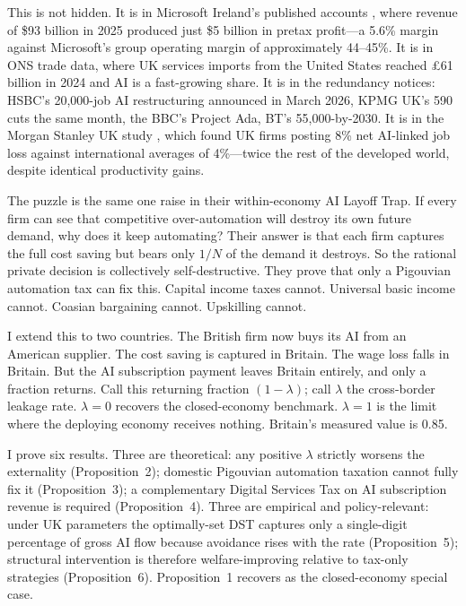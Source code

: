 \documentclass[11pt,letterpaper]{article}
\theoremstyle{remark}
\begin{document}
This is not hidden. It is in Microsoft Ireland's published accounts \citep{ons_2024}, where revenue of \$93 billion in 2025 produced just \$5 billion in pretax profit---a 5.6\% margin against Microsoft's group operating margin of approximately 44--45\%. It is in {ONS} trade data, where {UK} services imports from the United States reached \pounds61 billion in 2024 and {AI} is a fast-growing share. It is in the redundancy notices: {HSBC}'s 20{,}000-job {AI} restructuring announced in March 2026, KPMG {UK}'s 590 cuts the same month, the {BBC}'s Project Ada, {BT}'s 55{,}000-by-2030. It is in the Morgan Stanley {UK} study \citep{morgan_stanley_2026}, which found {UK} firms posting 8\% net {AI}-linked job loss against international averages of 4\%---twice the rest of the developed world, despite identical productivity gains.

The puzzle is the same one \citet{hemenway_falk_tsoukalas_2026} raise in their within-economy {AI} Layoff Trap. If every firm can see that competitive over-automation will destroy its own future demand, why does it keep automating? Their answer is that each firm captures the full cost saving but bears only $1/N$ of the demand it destroys. So the rational private decision is collectively self-destructive. They prove that only a Pigouvian automation tax can fix this. Capital income taxes cannot. Universal basic income cannot. Coasian bargaining cannot. Upskilling cannot.

I extend this to two countries. The British firm now buys its {AI} from an American supplier. The cost saving is captured in Britain. The wage loss falls in Britain. But the {AI} subscription payment leaves Britain entirely, and only a fraction returns. Call this returning fraction $(1-\lambda)$; call $\lambda$ the cross-border leakage rate. $\lambda = 0$ recovers the \citet{hemenway_falk_tsoukalas_2026} closed-economy benchmark. $\lambda = 1$ is the limit where the deploying economy receives nothing. Britain's measured value is 0.85.

I prove six results. Three are theoretical: any positive $\lambda$ strictly worsens the externality (Proposition~2); domestic Pigouvian automation taxation cannot fully fix it (Proposition~3); a complementary Digital Services Tax on {AI} subscription revenue is required (Proposition~4). Three are empirical and policy-relevant: under {UK} parameters the optimally-set {DST} captures only a single-digit percentage of gross AI flow because avoidance rises with the rate (Proposition~5); structural intervention is therefore welfare-improving relative to tax-only strategies (Proposition~6). Proposition~1 recovers \citet{hemenway_falk_tsoukalas_2026} as the closed-economy special case.
\end{document}
